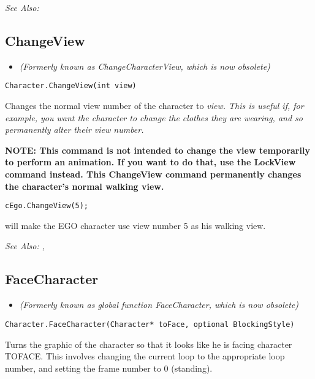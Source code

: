 \it{See Also:} 



\subsection{ChangeView}\label{Character.ChangeView}%

\begin{itemize}
\item \it{(Formerly known as ChangeCharacterView, which is now obsolete)}
\end{itemize}

\begin{verbatim}
Character.ChangeView(int view)
\end{verbatim}
Changes the normal view number of the character to \it{view}. This is
useful if, for example, you want the character to change the clothes
they are wearing, and so permanently alter their view number.

\bf{NOTE:} This command is \bf{not} intended to change the view temporarily to
perform an animation. If you want to do that, use the LockView command instead. This
ChangeView command permanently changes the character's normal walking view.

\begin{verbatim}
cEgo.ChangeView(5);
\end{verbatim}
will make the EGO character use view number 5 as his walking view.

\it{See Also:} ,


\subsection{FaceCharacter}\label{Character.FaceCharacter}%

\begin{itemize}
\item \it{(Formerly known as global function FaceCharacter, which is now obsolete)}
\end{itemize}

\begin{verbatim}
Character.FaceCharacter(Character* toFace, optional BlockingStyle)
\end{verbatim}
Turns the graphic of the character so that it looks like he is facing
character TOFACE. This involves changing the current loop to the appropriate
loop number, and setting the frame number to 0 (standing).

